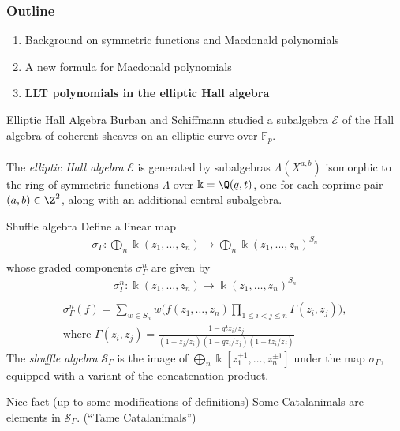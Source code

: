 \documentclass[dvipsnames]{beamer}
\newcommand{\Ecal}{\mathcal{E}}
\newcommand{\kk}{\Bbbk}
\newcommand{\Scal}{\mathcal{S}}
\theoremstyle{definition}
\begin{document}
\begin{frame}
  \frametitle{Outline}
  \begin{enumerate}
  \item Background on symmetric functions and Macdonald polynomials
  \item A new formula for Macdonald polynomials
  \item {\bf LLT polynomials in the elliptic Hall algebra}
  \end{enumerate}
\end{frame}
\begin{frame}{Elliptic Hall Algebra}
  Burban and Schiffmann studied a subalgebra  $\mathcal{E}$
of the Hall algebra of coherent sheaves on an elliptic curve over
$\mathbb{F}_p$. \\

\ \\

The \emph{elliptic Hall algebra} $\Ecal$ is generated by subalgebras $\Lambda(X^{a,b})$
isomorphic to the ring of symmetric functions  $\Lambda$ over $\kk = \Q(q,t)$,
one for each coprime pair $(a,b) \in \Z^2$, along with an additional
central subalgebra.
\end{frame}
\begin{frame}{Shuffle algebra}
  Define a linear map
\vspace{-2.3mm}
\begin{align*}
\sigma_\Gamma \colon \bigoplus_n \kk(z_1,\ldots,z_n) \to \bigoplus_n \kk(z_1,\ldots,z_n)^{S_n} \\[-10mm]
\end{align*}
whose graded components  $\sigma_\Gamma^n$ are given by \pause
\vspace{-1.4mm}
\begin{align*}
 \sigma_\Gamma^{n} \colon \kk (z_{1},\ldots,z_{n}) \to \kk (z_{1},\ldots,z_{n})^{S_n} \\[-11mm]
\end{align*}
\begin{align*}
 \sigma_\Gamma^{n}(f) = \sum _{w\in S_{n}}
w\bigl(f(z_{1},\ldots,z_{n})\prod _{1 \le i<j \le n}\Gamma
  (z_{i},z_{j})\bigr), \\
  \text{where }\Gamma(z_i,z_j) = \frac{1-qt z_i/z_j}{(1-z_j/z_i)(1-q z_i/z_j)(1-tz_i/z_j)}
\end{align*} \pause
The \emph{shuffle algebra}  $\Scal_\Gamma$ is the  image of
$\bigoplus _{n} \kk[z_{1}^{\pm 1},\ldots,z_n^{\pm 1}]$ under the map $\sigma_\Gamma$,
equipped with a variant of the concatenation product. \pause
\begin{block}{Nice fact (up to some modifications of definitions)}
  Some Catalanimals are elements in \(\Scal_\Gamma\). (``Tame Catalanimals'')
\end{block}
\end{frame}
\end{document}
